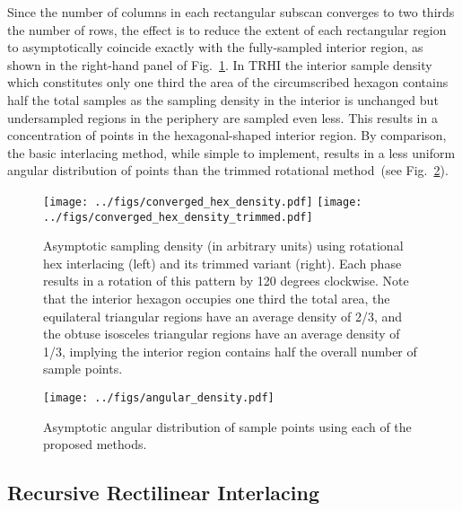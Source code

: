 \documentclass{article}
\newcommand{\reffig}[1]{Fig.~\ref{fig:#1}}
\begin{document}
Since the number of columns in each rectangular subscan converges to two thirds
the number of rows, the effect is to reduce the extent of each rectangular
region to asymptotically coincide exactly with the fully-sampled interior
region, as shown in the right-hand panel of \reffig{hexdensity}.
%
In TRHI the interior sample density which constitutes only one third the area of the circumscribed hexagon contains half the total samples as the sampling density in the interior is unchanged but undersampled regions in the periphery are sampled even less.
%
This results in a concentration of points in the hexagonal-shaped interior region.
%
By comparison, the basic interlacing method, while simple to implement, results in a less uniform angular distribution of points than the trimmed rotational method~(see \reffig{angdens}).

\begin{figure}[ht]
\centering
\texttt{[image: ../figs/converged\_hex\_density.pdf]}
\texttt{[image: ../figs/converged\_hex\_density\_trimmed.pdf]}
\caption{
\label{fig:hexdensity}
	Asymptotic sampling density (in arbitrary units) using rotational hex interlacing (left) and its trimmed variant (right).
%
Each phase results in a rotation of this pattern by 120 degrees clockwise.
%
%
Note that the interior hexagon occupies one third the total area, the equilateral triangular regions have an average density of 2/3, and the obtuse isosceles triangular regions have an average density of 1/3, implying the interior region contains half the overall number of sample points.
}
\end{figure}


\begin{figure}
\centering
\texttt{[image: ../figs/angular\_density.pdf]}
\caption{
\label{fig:angdens} 
	Asymptotic angular distribution of sample points using each of the proposed methods.
}
\end{figure}

\subsection{Recursive Rectilinear Interlacing}
\label{sec:recursive}
\end{document}
